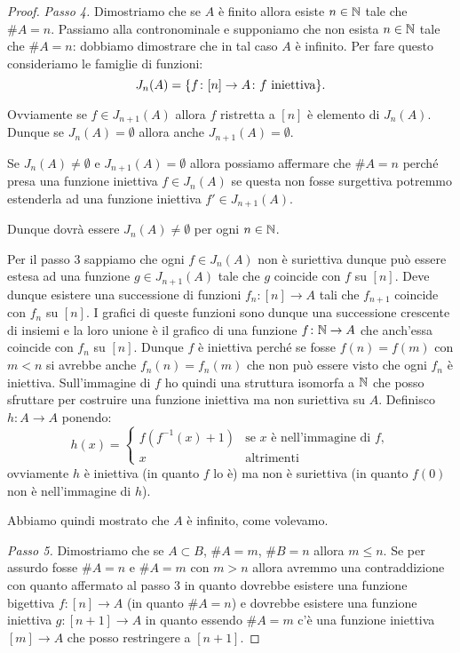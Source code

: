 \begin{proof}
\emph{Passo 4.}
Dimostriamo che se $A$ è finito allora esiste $n\in {\mathbb N}$ tale che $\#A=n$.
Passiamo alla contronominale e supponiamo che non esista $n\in {\mathbb N}$ tale che $\#A=n$:
dobbiamo dimostrare che in tal caso $A$ è infinito.
Per fare questo consideriamo le famiglie di funzioni:
\[
  J_n(A) = {\left\{ f\colon [n]\to A\colon f \text{ iniettiva} \right\}}.
\]

Ovviamente se $f\in J_{n+1}(A)$ allora $f$ ristretta a $[n]$ è elemento di $J_n(A)$.
Dunque se $J_n(A)=\emptyset$ allora anche $J_{n+1}(A)=\emptyset$.
 
Se $J_n(A)\neq \emptyset$ e $J_{n+1}(A)=\emptyset$ allora possiamo affermare che $\#A=n$ 
perché presa una funzione iniettiva $f\in J_n(A)$ se questa non fosse surgettiva potremmo 
estenderla ad una funzione iniettiva $f'\in J_{n+1}(A)$.

Dunque dovrà essere $J_n(A)\neq \emptyset$ per ogni $n\in {\mathbb N}$.

Per il passo 3 sappiamo che ogni 
$f\in J_n(A)$ non è suriettiva dunque può essere estesa 
ad una funzione $g\in J_{n+1}(A)$
tale che $g$ coincide con $f$ su $[n]$. 
Deve dunque esistere una successione di funzioni
$f_n\colon [n]\to A$ tali che $f_{n+1}$ coincide con $f_n$ su $[n]$.
I grafici di queste funzioni sono dunque una successione crescente di insiemi e la loro 
unione è il grafico di una funzione $f\colon {\mathbb N} \to A$ che anch'essa 
coincide con $f_n$ su $[n]$. 
Dunque $f$ è iniettiva perché se fosse $f(n)=f(m)$
con $m<n$ si avrebbe anche $f_n(n)=f_n(m)$ che non può essere visto che ogni $f_n$ è iniettiva.
Sull'immagine di $f$ ho quindi una struttura isomorfa a ${\mathbb N}$ che posso sfruttare per 
costruire una funzione iniettiva ma non suriettiva su $A$.
Definisco $h\colon A\to A$ ponendo:
\[
  h(x) = \begin{cases}
    f(f^{-1}(x)+1) &\text{se $x$ è nell'immagine di $f$},\\
    x &\text{altrimenti}
  \end{cases}
\]
ovviamente $h$ è iniettiva (in quanto $f$ lo è) 
ma non è suriettiva (in quanto $f(0)$ non è nell'immagine di $h$).

Abbiamo quindi mostrato che $A$ è infinito, come volevamo.

\emph{Passo 5.}
Dimostriamo che se $A\subset B$, $\#A=m$, $\#B=n$ allora $m\le n$.
Se per assurdo fosse $\#A=n$ e $\#A=m$ con $m>n$ allora 
avremmo una contraddizione con quanto affermato al passo 3
in quanto dovrebbe esistere una funzione bigettiva $f\colon[n]\to A$ 
(in quanto $\#A=n$) e dovrebbe esistere una funzione iniettiva 
$g\colon[n+1]\to A$ in quanto essendo $\#A=m$ c'è una funzione iniettiva 
$[m]\to A$ che posso restringere a $[n+1]$.
\end{proof}

